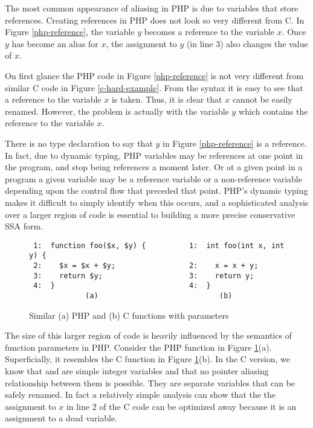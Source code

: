 The most common appearance of aliasing in PHP is due to variables that
store references. Creating references in PHP does not look so very
different from C. In Figure \ref{php-reference}, the variable $y$
becomes a reference to the variable $x$. Once $y$ has become an alias
for $x$, the assignment to $y$ (in line 3) also changes the value of
$x$.

On first glance the PHP code in Figure \ref{php-reference} is not very
different from similar C code in Figure \ref{c-hard-example}. From the
syntax it is easy to see that a reference to the variable $x$ is
taken.  Thus, it is clear that $x$ cannot be easily renamed. However,
the problem is actually with the variable $y$ which contains the
reference to the variable $x$.

There is no type declaration to say that $y$ in Figure
\ref{php-reference} is a reference. In fact, due to dynamic typing,
PHP variables may be references at one point in the program, and stop
being references a moment later. Or at a given point in a program a
given variable may be a reference variable or a non-reference variable
depending upon the control flow that preceded that point.  PHP's
dynamic typing makes it difficult to simply identify when this occurs,
and a sophisticated analysis over a larger region of code is essential
to building a more precise conservative SSA form.

\begin{figure}[thp]
\begin{verbatim}
 1:  function foo($x, $y) {          1:  int foo(int x, int y) {
 2:    $x = $x + $y;                 2:    x = x + y;
 3:    return $y;                    3:    return y;
 4:  }                               4:  }
             (a)                            (b)
\end{verbatim}
\caption{Similar (a) PHP and (b) C functions with parameters}
\label{parameters}
\end{figure}

The size of this larger region of code is heavily influenced by the
semantics of function parameters in PHP. Consider the PHP function in
Figure \ref{parameters}(a).
Superficially, it resembles the C function in Figure \ref{parameters}(b).
In the C version, we know that  and  are simple integer
variables and that no pointer aliasing relationship between them is
possible.  They are separate variables that can be safely renamed. In
fact a relatively simple analysis can show that the the assignment to
$x$ in line 2 of the C code can be optimized away because it is an
assignment to a dead variable.

